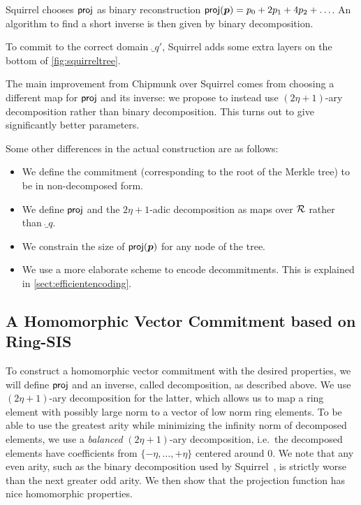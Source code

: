 Squirrel chooses $\mathsf{proj}$ as binary reconstruction $\mathsf{proj}(\boldsymbol{p}) = p_0 + 2p_1 + 4p_2 + \ldots$.
An algorithm to find a short inverse is then given by binary decomposition.

To commit to the correct domain $\ring_{q'}$, Squirrel adds some extra layers on the bottom of \autoref{fig:squirreltree}.

The main improvement from Chipmunk over Squirrel comes from choosing a different map for $\mathsf{proj}$ and its inverse: we propose to instead use $(2\eta+1)$-ary decomposition rather than binary decomposition.
This turns out to give significantly better parameters.

Some other differences in the actual construction are as follows:
\begin{itemize}
 \item We define the commitment (corresponding to the root of the Merkle tree) to be in non-decomposed form.
 \item We define $\mathsf{proj}$ and the $2\eta+1$-adic decomposition as maps over $\mathcal{R}$ rather than $\ring_q$.
 \item We constrain the size of $\mathsf{proj}(\boldsymbol{p})$ for any node of the tree.
 \item We use a more elaborate scheme to encode decommitments. This is explained in \autoref{sect:efficientencoding}.
\end{itemize}

\subsection{A Homomorphic Vector Commitment based on Ring-SIS}
To construct a homomorphic vector commitment with the desired properties, we will define $\mathsf{proj}$ and an inverse, called decomposition, as described above.
We use $(2\eta+1)$-ary decomposition for the latter, which allows us to map a ring element with possibly large norm to a vector of low norm ring elements.
To be able to use the greatest arity while minimizing the infinity norm of decomposed elements, we use a \emph{balanced} $(2\eta+1)$-ary decomposition, i.e.\ the decomposed elements have coefficients from $\{-\eta,\ldots,+\eta\}$ centered around 0.
We note that any even arity, such as the binary decomposition used by Squirrel~\cite{CCS:FleSimZha22}, is strictly worse than the next greater odd arity.
We then show that the projection function has nice homomorphic properties.

